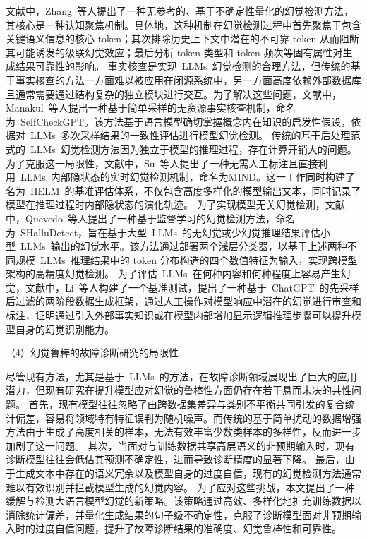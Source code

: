 % 
文献\cite{20240715556058}中，Zhang~等人提出了一种无参考的、基于不确定性量化的幻觉检测方法，其核心是一种认知聚焦机制。具体地，这种机制在幻觉检测过程中首先聚焦于包含关键语义信息的核心 token；其次排除历史上下文中潜在的不可靠 token 从而阻断其可能诱发的级联幻觉效应；最后分析 token 类型和 token 频次等固有属性对生成结果可靠性的影响。
% 
事实核查是实现~LLMs~幻觉检测的合理方法，但传统的基于事实核查的方法一方面难以被应用在闭源系统中，另一方面高度依赖外部数据库且通常需要通过结构复杂的独立模块进行交互。为了解决这些问题，文献\cite{selfcheckgpt}中，Manakul~等人提出一种基于简单采样的无资源事实核查机制，命名为~SelfCheckGPT。该方法基于语言模型确切掌握概念内在知识的启发性假设，依据对~LLMs~多次采样结果的一致性评估进行模型幻觉检测。
% 
传统的基于后处理范式的~LLMs~幻觉检测方法因为独立于模型的推理过程，存在计算开销大的问题。为了克服这一局限性，文献\cite{su-etal-2024-unsupervised}中，Su~等人提出了一种无需人工标注且直接利用~LLMs~内部隐状态的实时幻觉检测机制，命名为MIND。这一工作同时构建了名为~HELM~的基准评估体系，不仅包含高度多样化的模型输出文本，同时记录了模型在推理过程时内部隐状态的演化轨迹。
% 
为了实现模型无关幻觉检测，文献\cite{10.1007/978-3-031-86623-4_13}中，Quevedo~等人提出了一种基于监督学习的幻觉检测方法，命名为~SHalluDetect，旨在基于大型~LLMs~的无幻觉或少幻觉推理结果评估小型~LLMs~输出的幻觉水平。该方法通过部署两个浅层分类器，以基于上述两种不同规模~LLMs~推理结果中的 token 分布构造的四个数值特征为输入，实现跨模型架构的高精度幻觉检测。
% 
为了评估~LLMs~在何种内容和何种程度上容易产生幻觉，文献\cite{li-etal-2023-halueval}中，Li~等人构建了一个基准测试，提出了一种基于~ChatGPT~的先采样后过滤的两阶段数据生成框架，通过人工操作对模型响应中潜在的幻觉进行审查和标注，证明通过引入外部事实知识或在模型内部增加显示逻辑推理步骤可以提升模型自身的幻觉识别能力。

（4）幻觉鲁棒的故障诊断研究的局限性

尽管现有方法，尤其是基于~LLMs~的方法，在故障诊断领域展现出了巨大的应用潜力，但现有研究在提升模型应对幻觉的鲁棒性方面仍存在若干悬而未决的共性问题。
首先，现有模型往往忽略了由跨数据集差异与类别不平衡共同引发的复合统计偏差，容易将领域特有特征误判为随机噪声。而传统的基于简单扰动的数据增强方法由于生成了高度相关的样本，无法有效丰富少数类样本的多样性，反而进一步加剧了这一问题。
其次，当面对与训练数据共享高层语义的非预期输入时，现有诊断模型往往会低估其预测不确定性，进而导致诊断精度的显著下降。
最后，由于生成文本中存在的语义冗余以及模型自身的过度自信，现有的幻觉检测方法通常难以有效识别并拦截模型生成的幻觉内容。
为了应对这些挑战，本文提出了一种缓解与检测大语言模型幻觉的新策略。该策略通过高效、多样化地扩充训练数据以消除统计偏差，并量化生成结果的句子级不确定性，克服了诊断模型面对非预期输入时的过度自信问题，提升了故障诊断结果的准确度、幻觉鲁棒性和可靠性。

